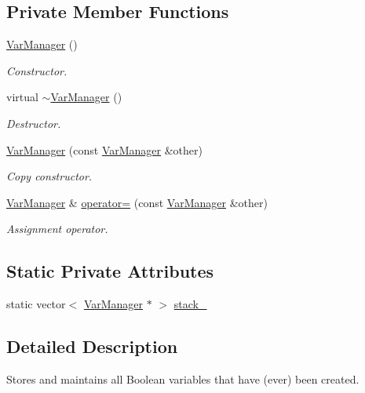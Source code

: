 \subsection*{Private Member Functions}
\begin{DoxyCompactItemize}
\item 
\hyperlink{classVarManager_a45bd9ed93e1c1303a9dff791e998cbc5}{Var\-Manager} ()
\begin{DoxyCompactList}\small\item\em Constructor. \end{DoxyCompactList}\item 
virtual \hyperlink{classVarManager_a72b49931cef85f483f35146e92eb4da5}{$\sim$\-Var\-Manager} ()
\begin{DoxyCompactList}\small\item\em Destructor. \end{DoxyCompactList}\item 
\hyperlink{classVarManager_a5be5f509e4939b010a770b3df400a84f}{Var\-Manager} (const \hyperlink{classVarManager}{Var\-Manager} \&other)
\begin{DoxyCompactList}\small\item\em Copy constructor. \end{DoxyCompactList}\item 
\hyperlink{classVarManager}{Var\-Manager} \& \hyperlink{classVarManager_abdc12c45522a97f361d736cf05fa1798}{operator=} (const \hyperlink{classVarManager}{Var\-Manager} \&other)
\begin{DoxyCompactList}\small\item\em Assignment operator. \end{DoxyCompactList}\end{DoxyCompactItemize}
\subsection*{Static Private Attributes}
\begin{DoxyCompactItemize}
\item 
static vector$<$ \hyperlink{classVarManager}{Var\-Manager} $\ast$ $>$ \hyperlink{classVarManager_aba622884c64d1a16cd086b34cb71acd8}{stack\-\_\-}
\end{DoxyCompactItemize}


\subsection{Detailed Description}
Stores and maintains all Boolean variables that have (ever) been created. 

